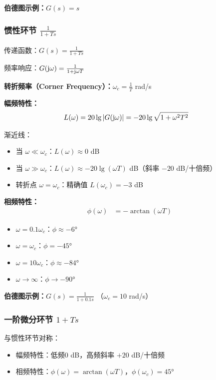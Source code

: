 \textbf{伯德图示例：}$G(s) = s$
\begin{center}
\end{center}

\subsubsection{惯性环节 \texorpdfstring{$\frac{1}{1+Ts}$}{1/(1+Ts)}}
传递函数：$G(s) = \frac{1}{1+Ts}$

频率响应：$G(\mathrm{j}\omega) = \frac{1}{1+\mathrm{j}\omega T}$

\textbf{转折频率（Corner Frequency）：}$\omega_c = \frac{1}{T}$ rad/s

\textbf{幅频特性：}
\begin{align*}
L(\omega) &= 20\lg|G(\mathrm{j}\omega)| = -20\lg\sqrt{1 + \omega^2T^2}
\end{align*}

渐近线：
\begin{itemize}
    \item 当 $\omega \ll \omega_c$：$L(\omega) \approx 0$ dB
    \item 当 $\omega \gg \omega_c$：$L(\omega) \approx -20\lg(\omega T)$ dB（斜率 $-20$ dB/十倍频）
    \item 转折点 $\omega = \omega_c$：精确值 $L(\omega_c) = -3$ dB
\end{itemize}

\textbf{相频特性：}
\begin{align*}
\phi(\omega) &= -\arctan(\omega T)
\end{align*}
\begin{itemize}
    \item $\omega = 0.1\omega_c$：$\phi \approx -6°$
    \item $\omega = \omega_c$：$\phi = -45°$
    \item $\omega = 10\omega_c$：$\phi \approx -84°$
    \item $\omega \to \infty$：$\phi \to -90°$
\end{itemize}

\textbf{伯德图示例：}$G(s) = \frac{1}{1+0.1s}$ （$\omega_c = 10$ rad/s）
\begin{center}
\end{center}

\subsubsection{一阶微分环节 $1+Ts$}
与惯性环节对称：
\begin{itemize}
    \item 幅频特性：低频0 dB，高频斜率 $+20$ dB/十倍频
    \item 相频特性：$\phi(\omega) = \arctan(\omega T)$，$\phi(\omega_c) = 45°$
\end{itemize}


